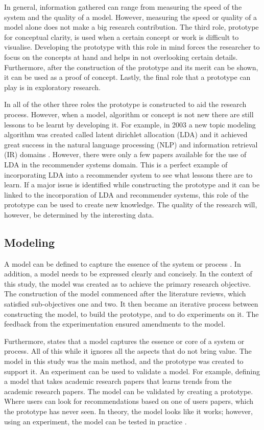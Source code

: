 In general, information gathered can range from measuring the speed of the system and the quality of a model. However, measuring the speed or quality of a model alone does not make a big research contribution. The third role, prototype for conceptual clarity, is used when a certain concept or work is difficult to visualise. Developing the prototype with this role in mind forces the researcher to focus on the concepts at hand and helps in not overlooking certain details. Furthermore, after the construction of the prototype and its merit can be shown, it can be used as a proof of concept. Lastly, the final role that a prototype can play is in exploratory research.

In all of the other three roles the prototype is constructed to aid the research process. However, when a model, algorithm or concept is not new there are still lessons to be learnt by developing it. For example, in 2003 a new topic modeling algorithm was created called latent dirichlet allocation (LDA) and it achieved great success in the natural language processing (NLP) and information retrieval (IR) domains \cite{blei2003latent}. However, there were only a few papers available for the use of LDA in the recommender systems domain. This is a perfect example of incorporating LDA into a recommender system to see what lessons there are to learn. If a major issue is identified while constructing the prototype and it can be linked to the incorporation of LDA and recommender systems, this role of the prototype can be used to create new knowledge. The quality of the research will, however, be determined by the interesting data.

\subsection{Modeling} \label{ssec:model}

A model can be defined to capture the essence of the system or process \cite{olivier2009information}. In addition, a model needs to be expressed clearly and concisely. In the context of this study, the model was created as to achieve the primary research objective. The construction of the model commenced after the literature reviews, which satisfied sub-objectives one and two. It then became an iterative process between constructing the model, to build the prototype, and to do experiments on it. The feedback from the experimentation ensured amendments to the model.

Furthermore,  states that a model captures the essence or core of a system or process. All of this while it ignores all the aspects that do not bring value. The model in this study was the main method, and the prototype was created to support it. An experiment can be used to validate a model. For example, defining a model that takes academic research papers that learns trends from the academic research papers. The model can be validated by creating a prototype. Where users can look for recommendations based on one of users papers, which the prototype has never seen. In theory, the model looks like it works; however, using an experiment, the model can be tested in practice \cite{Steenkamp2007}.

